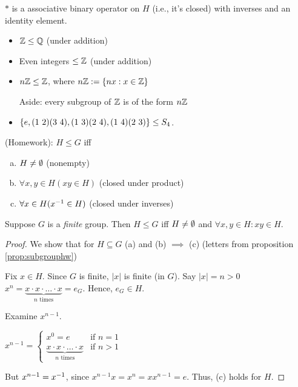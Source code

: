 \documentclass[notes.tex]{subfiles}
\begin{document}
$*$ is a associative binary operator on $H$ (i.e., it's closed) with inverses and an identity element.

\begin{eg}\leavevmode
	\begin{itemize}
		\item $\mathbb{Z}\le\mathbb{Q}$ (under addition)
		\item Even integers $\le \mathbb{Z}$ (under addition)
		\item $n\mathbb{Z} \le\mathbb{Z}$, where $n\mathbb{Z} := \{nx : x\in \mathbb{Z}\}$

		Aside: every subgroup of $\mathbb{Z}$ is of the form $n\mathbb{Z}$
		\item $\{e, \text{(1 2)}\text{(3 4)}, \text{(1 3)}\text{(2 4)}, \text{(1 4)}\text{(2 3)}\} \le S_4$.
	\end{itemize}
\end{eg}


\begin{proposition}
	\label{prop:subgrouphw}
	(Homework): $H\le G$ iff
	\begin{enumerate}[(a)]
		\item $H\ne\emptyset$ (nonempty)
		\item $\forall x,y\in H (xy\in H)$ (closed under product)
		\item $\forall x\in H ({x}^{-1}\in H)$  (closed under inverses)
	\end{enumerate}
\end{proposition}

\begin{proposition}
	Suppose $G$ is a \emph{finite} group.
	Then $H \le G$ iff $H \ne\emptyset$ and $\forall x,y\in H: xy\in H$.
\end{proposition}

\begin{proof}
	We show that for $H\subseteq G$
	(a) and (b) $\implies$ (c) (letters from proposition \eqref{prop:subgrouphw})

	Fix $x\in H$.
	Since $G$ is finite, $|x|$ is finite (in $G$). Say $|x| = n > 0$
	$x^n = \underbrace{x\cdot x\cdot \ldots \cdot x}_{n\text{ times}} = e_G.$ Hence, $e_G\in H$.

	Examine $x^{n-1}$.

	$x^{n-1} = \begin{cases}
		x^0 = e & \text{if } n = 1\\
		\underbrace{x\cdot x\cdot\ldots\cdot x}_{n\text{ times}} &\text{if } n > 1
	\end{cases}$

	But $x^{n-1} = {x}^{-1}$, since $x^{n-1}x = x^n = xx^{n-1} = e$.
	Thus, (c) holds for $H$.
\end{proof}
\end{document}
